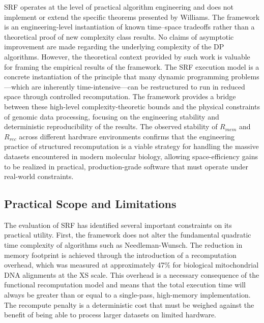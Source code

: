 SRF operates at the level of practical algorithm engineering and does not implement or extend the specific theorems presented by Williams. The framework is an engineering-level instantiation of known time--space tradeoffs rather than a theoretical proof of new complexity class results. No claims of asymptotic improvement are made regarding the underlying complexity of the DP algorithms. However, the theoretical context provided by such work is valuable for framing the empirical results of the framework. The SRF execution model is a concrete instantiation of the principle that many dynamic programming problems---which are inherently time-intensive---can be restructured to run in reduced space through controlled recomputation. The framework provides a bridge between these high-level complexity-theoretic bounds and the physical constraints of genomic data processing, focusing on the engineering stability and deterministic reproducibility of the results. The observed stability of $R_{mem}$ and $R_{rec}$ across different hardware environments confirms that the engineering practice of structured recomputation is a viable strategy for handling the massive datasets encountered in modern molecular biology, allowing space-efficiency gains to be realized in practical, production-grade software that must operate under real-world constraints.

\subsection{Practical Scope and Limitations}

The evaluation of SRF has identified several important constraints on its practical utility. First, the framework does not alter the fundamental quadratic time complexity of algorithms such as Needleman-Wunsch. The reduction in memory footprint is achieved through the introduction of a recomputation overhead, which was measured at approximately 47\% for biological mitochondrial DNA alignments at the XS scale. This overhead is a necessary consequence of the functional recomputation model and means that the total execution time will always be greater than or equal to a single-pass, high-memory implementation. The recompute penalty is a deterministic cost that must be weighed against the benefit of being able to process larger datasets on limited hardware.

